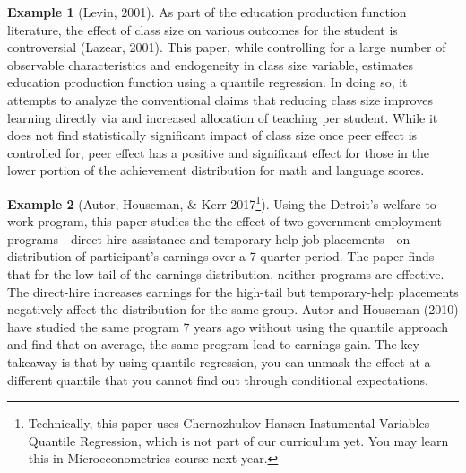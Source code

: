 \documentclass[12pt]{article}
\theoremstyle{definition}
\theoremstyle{property}
\theoremstyle{assumption}
\theoremstyle{example}
\newtheorem{example}{Example}[section]
\theoremstyle{comment}
\begin{document}
\begin{mdframed}[backgroundcolor=yellow!5] 
\begin{example}[Levin, 2001]
As part of the education production function literature, the effect of class size on various outcomes for the student is controversial (Lazear, 2001). This paper, while controlling for a large number of observable characteristics and endogeneity in class size variable, estimates education production function using a quantile regression. In doing so, it attempts to analyze the conventional claims that reducing class size improves learning directly via and increased allocation of teaching per student. While it does not find statistically significant impact of class size once peer effect is controlled for, peer effect has a positive and significant effect for those in the lower portion of the achievement distribution for math and language scores. 
\end{example}

\begin{example}[Autor, Houseman, \& Kerr 2017\footnote{Technically, this paper uses Chernozhukov-Hansen Instumental Variables Quantile Regression, which is not part of our curriculum yet. You may learn this in Microeconometrics course next year.}]
Using the Detroit's welfare-to-work program, this paper studies the the effect of two government employment programs - direct hire assistance and temporary-help job placements - on distribution of participant's earnings over a 7-quarter period. The paper finds that for the low-tail of the earnings distribution, neither programs are effective. The direct-hire increases earnings for the high-tail but temporary-help placements negatively affect the distribution for the same group.  Autor and Houseman (2010) have studied the same program 7 years ago without using the quantile approach and find that on average, the same program lead to earnings gain. The key takeaway is that by using quantile regression, you can unmask the effect at a different quantile that you cannot find out through conditional expectations. 
\end{example}
\end{mdframed}
\end{document}
